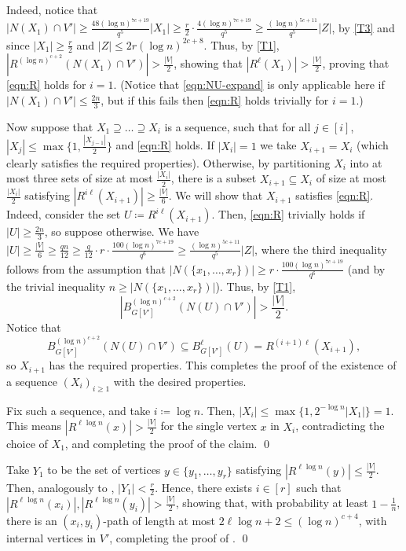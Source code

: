 \documentclass[10pt]{article}
\theoremstyle{plain}
\numberwithin{theorem}{section}
\theoremstyle{definition}
\theoremstyle{remark}
\renewenvironment{proof}[1][]{\begin{trivlist}
\item[\hspace{\labelsep}{\bf\noindent Proof#1.\/}] }{\qed\end{trivlist}}
\theoremstyle{plain}
\begin{document}
\begin{proof}
\begin{proof}
				Indeed, notice that $|N(X_1) \cap V'| \ge \frac{48 (\log n)^{7c+19}}{q^5} |X_1| \ge \frac{r}{2} \cdot \frac{4 (\log n)^{7c+19}}{q^5} \ge \frac{(\log n)^{5c+11}}{q^5}|Z|$, by \ref{T3} and since $|X_1| \ge \frac{r}{2}$ and $|Z| \le 2r (\log n)^{2c+8}$. Thus, by \ref{T1}, $|R^{(\log n)^{c+2}}(N(X_1) \cap V')| > \frac{|V|}{2}$, showing that $|R^{\ell}(X_1)| > \frac{|V|}{2}$, proving that \eqref{eqn:R} holds for $i = 1$. (Notice that \eqref{eqn:NU-expand} is only applicable here if $|N(X_1) \cap V'| \le \frac{2n}{3}$, but if this fails then \eqref{eqn:R} holds trivially for $i = 1$.)	

				Now suppose that $X_1 \supseteq \ldots \supseteq X_i$ is a sequence, such that for all $j \in [i]$, $|X_{j}| \le \max\{1, \frac{|X_{j-1}|}{2}\}$ and \eqref{eqn:R} holds. If $|X_i| = 1$ we take $X_{i+1} = X_i$ (which clearly satisfies the required properties). Otherwise, by partitioning $X_i$ into at most three sets of size at most $\frac{|X_i|}{2}$, there is a subset $X_{i+1} \subseteq X_i$ of size at most $\frac{|X_i|}{2}$ satisfying $|R^{i\ell}(X_{i+1})| \ge \frac{|V|}{6}$. 
				We will show that $X_{i+1}$ satisfies \eqref{eqn:R}. Indeed, consider the set $U \coloneqq R^{i\ell}(X_{i+1})$. 
				Then, \eqref{eqn:R} trivially holds if $|U| \ge \frac{2n}{3}$, so suppose otherwise.
				We have $|U| \ge \frac{|V|}{6} \ge \frac{qn}{12} \ge \frac{q}{12} \cdot r \cdot \frac{100 (\log n)^{7c+19}}{q^6} \ge \frac{(\log n)^{5c+11}}{q^5}|Z|$, where the third inequality follows from the assumption that $|N(\{x_1, \ldots, x_r\})| \ge r \cdot \frac{100(\log n)^{7c+19}}{q^6}$ (and by the trivial inequality $n \ge |N(\{x_1, \ldots, x_r\})|$). Thus, by \ref{T1},
				\begin{equation*}
					\left|B_{G[V']}^{(\log n)^{c+2}}\left(N(U) \cap V'\right)\right|
					> \frac{|V|}{2}.
				\end{equation*}
				Notice that
				\begin{equation*}
					B^{(\log n)^{c+2}}_{G[V']}\left(N(U) \cap V'\right) 
					\subseteq B_{G[V']}^{\ell}(U)
					= R^{(i+1) \ell}(X_{i+1}),
				\end{equation*}
				so $X_{i+1}$ has the required properties.
				This completes the proof of the existence of a sequence $(X_i)_{i \ge 1}$ with the desired properties. 

				Fix such a sequence, and take $i \coloneqq \log n$. Then, $|X_i| \le \max\{1, 2^{-\log n}|X_1|\} = 1$. This means $|R^{\ell \log n}(x)| > \frac{|V|}{2}$ for the single vertex $x$ in $X_i$, contradicting the choice of $X_1$, and completing the proof of the claim.
			\end{proof}
			Take $Y_1$ to be the set of vertices $y \in \{y_1, \ldots, y_r\}$ satisfying $|R^{\ell \log n}(y)| \le \frac{|V|}{2}$. Then, analogously to , $|Y_1| < \frac{r}{2}$.
			Hence, there exists $i \in [r]$ such that $|R^{\ell \log n}(x_i)|, |R^{\ell \log n}(y_i)| > \frac{|V|}{2}$, showing that, with probability at least $1 - \frac{1}{n}$, there is an $(x_i,y_i)$-path of length at most $2\ell \log n + 2 \le (\log n)^{c+4}$, with internal vertices in $V'$, completing the proof of .
		\end{proof}
\end{document}
